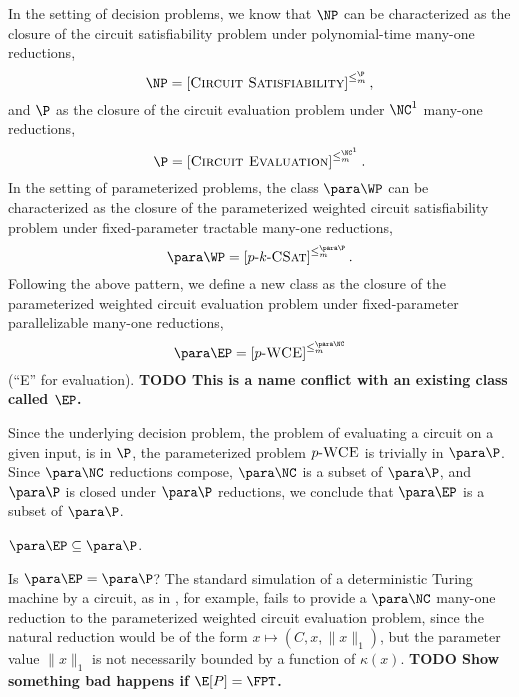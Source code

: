 \documentclass{article}
\newcommand{\todo}[1]{\textbf{TODO #1}}
\newcommand{\dash}{\textnormal{-}}
\newcommand{\pCkSAT}{p \dash k \dash \textsc{CSat}}
\newcommand{\pWCE}{p \dash \textsc{WCE}}
\newcommand{\cl}[1]{\left[{#1}\right]}
\begin{document}

In the setting of decision problems, we know that $\NP$ can be characterized as the closure of the circuit satisfiability problem under polynomial-time many-one reductions,
\[
\NP = \cl{\textsc{Circuit Satisfiability}}^{\leq_m^\P},
\]
and $\P$ as the closure of the circuit evaluation problem under $\NC^1$ many-one reductions,
\[
\P = \cl{\textsc{Circuit Evaluation}}^{\leq_m^{\NC^1}}.
\]
In the setting of parameterized problems, the class $\para \WP$ can be characterized as the closure of the parameterized weighted circuit satisfiability problem under fixed-parameter tractable many-one reductions,
\[
\para \WP = \cl{\pCkSAT}^{\leq_m^{\para \P}}.
\]
Following the above pattern, we define a new class as the closure of the parameterized weighted circuit evaluation problem under fixed-parameter parallelizable many-one reductions,
\[
\para \EP = \cl{\pWCE}^{\leq_m^{\para \NC}}
\]
(``E'' for evaluation).
\todo{This is a name conflict with an existing class called $\EP$.}

Since the underlying decision problem, the problem of evaluating a circuit on a given input, is in $\P$, the parameterized problem $\pWCE$ is trivially in $\para \P$.
Since $\para \NC$ reductions compose, $\para \NC$ is a subset of $\para \P$, and $\para \P$ is closed under $\para \P$ reductions, we conclude that $\para \EP$ is a subset of $\para \P$.

\begin{theorem}
  $\para \EP \subseteq \para \P$.
\end{theorem}

Is $\para \EP = \para \P$?
The standard simulation of a deterministic Turing machine by a circuit, as in \autocite{ladner75}, for example, fails to provide a $\para \NC$ many-one reduction to the parameterized weighted circuit evaluation problem, since the natural reduction would be of the form $x \mapsto (C, x, \|x\|_1)$, but the parameter value $\|x\|_1$ is not necessarily bounded by a function of $\kappa(x)$.
\todo{Show something bad happens if $\E[P] = \FPT$.}
\end{document}
